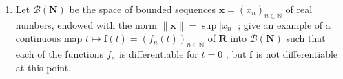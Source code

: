 \begin{enumerate}
\def\labelenumi{\arabic{enumi})}
\setcounter{enumi}{8}
\tightlist
\item
  Let \(\mathcal{B}(\mathbf{N})\) be the space of bounded sequences \(\mathbf{x} = (x_n)_{n\in \mathbb{N}}\) of real numbers, endowed with the norm \(\| \mathbf{x}\| = \sup |x_n|\) ; give an example of a continuous map \(t\mapsto \mathbf{f}(t) = (f_n(t))_{n\in \mathbb{N}}\) of \(\mathbf{R}\) into \(\mathcal{B}(\mathbf{N})\) such that each of the functions \(f_{n}\) is differentiable for \(t = 0\) , but \(\mathbf{f}\) is not differentiable at this point.
\end{enumerate}

\setcounter{exercisegroup}{1}
